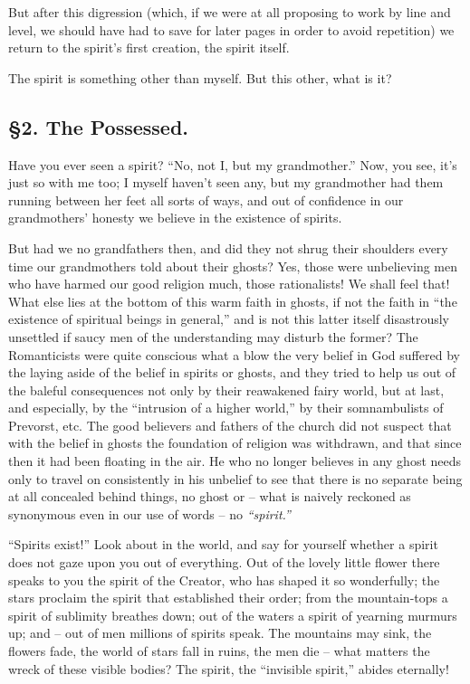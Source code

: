 \documentclass[12pt,a4paper]{book}
\begin{document}
But after this digression (which, if we were at all proposing to work by line 
and level, we should have had to save for later pages in order to avoid 
repetition) we return to the spirit's first creation, the spirit itself.

The spirit is something other than myself. But this other, what is it?

\medskip{}

\subsection[\S{}2. The Possessed]{\centering \S{}2. The Possessed.}

Have you ever seen a spirit? ``No, not I, but my grandmother.'' Now, you 
see, it's just so with me too; I myself haven't seen any, but my grandmother 
had them running between her feet all sorts of ways, and out of confidence in 
our grandmothers' honesty we believe in the existence of spirits.

But had we no grandfathers then, and did they not shrug their shoulders every 
time our grandmothers told about their ghosts? Yes, those were unbelieving men 
who have harmed our good religion much, those rationalists! We shall feel 
that! What else lies at the bottom of this warm faith in ghosts, if not the 
faith in ``the existence of spiritual beings in general,'' and is not this 
latter itself disastrously unsettled if saucy men of the understanding may 
disturb the former? The Romanticists were quite conscious what a blow the very 
belief in God suffered by the laying aside of the belief in spirits or ghosts, 
and they tried to help us out of the baleful consequences not only by their 
reawakened fairy world, but at last, and especially, by the ``intrusion of a 
higher world,'' by their somnambulists of Prevorst, etc. The good believers 
and fathers of the church did not suspect that with the belief in ghosts the 
foundation of religion was withdrawn, and that since then it had been floating 
in the air. He who no longer believes in any ghost needs only to travel on 
consistently in his unbelief to see that there is no separate being at all 
concealed behind things, no ghost or -- what is naively reckoned as synonymous 
even in our use of words -- no \textit{``spirit.''}

``Spirits exist!'' Look about in the world, and say for yourself whether a 
spirit does not gaze upon you out of everything. Out of the lovely little 
flower there speaks to you the spirit of the Creator, who has shaped it so 
wonderfully; the stars proclaim the spirit that established their order; from 
the mountain-tops a spirit of sublimity breathes down; out of the waters a 
spirit of yearning murmurs up; and -- out of men millions of spirits speak. 
The mountains may sink, the flowers fade, the world of stars fall in ruins, 
the men die -- what matters the wreck of these visible bodies? The spirit, the 
``invisible spirit,'' abides eternally!
\end{document}
